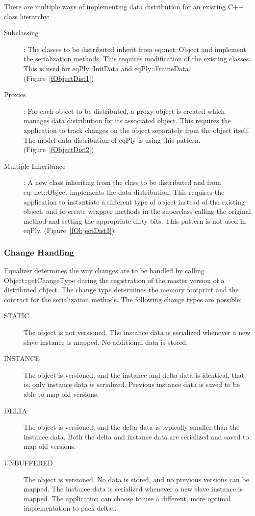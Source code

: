 \documentclass[10pt,a4]{scrartcl}
\newcommand{\fig}[1]{Figure~\ref{#1}}
\begin{document}
There are multiple ways of implementing data distribution for an
existing C++ class hierarchy:
\begin{description}
  \item[Subclassing]: The classes to be distributed inherit from
    \textsf{eq::net::Object} and implement the serialization
      methods. This requires modification of the existing classes. This
      is used for \textsf{eqPly::InitData} and
      \textsf{eqPly::FrameData}. (\fig{fObjectDist1})
  \item[Proxies]: For each object to be distributed, a proxy object is
    created which manages data distribution for its associated
    object. This requires the application to track changes on the object
    separately from the object itself. The model data distribution of
    eqPly is using this pattern. (\fig{fObjectDist2})
  \item[Multiple Inheritance]: A new class inheriting from the class to
    be distributed and from \textsf{eq::net::Object} implements the data
    distribution. This requires the application to instantiate a
    different type of object instead of the existing object, and to
    create wrapper methods in the superclass calling the original method
    and setting the appropriate dirty bits. This pattern is not used in
    eqPly. (\fig{fObjectDist3})
\end{description}

\subsubsection{Change Handling}

Equalizer determines the way changes are to be handled by calling
\textsf{Object::get\-Change\-Type} during the registration of the master
version of a distributed object. The change type determines the memory
footprint and the contract for the serialization methods. The following
change types are possible:

\begin{description}
  \item[STATIC] The object is not versioned. The instance data is
    serialized whenever a new slave instance is mapped. No additional
    data is stored.
  \item[INSTANCE] The object is versioned, and the instance and delta
    data is identical, that is, only instance data is
    serialized. Previous instance data is saved to be able to map old
    versions.
  \item[DELTA] The object is versioned, and the delta data is typically
    smaller than the instance data. Both the delta and instance data are
    serialized and saved to map old versions.
  \item[UNBUFFERED] The object is versioned. No data is stored, and no
    previous versions can be mapped. The instance data is serialized
    whenever a new slave instance is mapped. The application can choose
    to use a different, more optimal implementation to pack deltas.
\end{description}
\end{document}
